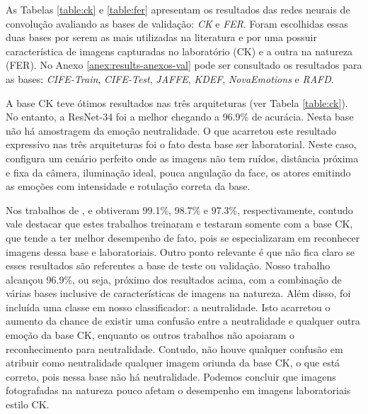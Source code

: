 As Tabelas \ref{table:ck} e \ref{table:fer} apresentam os resultados das redes neurais de convolução avaliando as bases de validação: \textit{CK} e \textit{FER}. Foram escolhidas essas duas bases por serem as mais utilizadas na literatura e por uma possuir característica de imagens capturadas no laboratório (CK) e a outra na natureza (FER). No Anexo \ref{anex:results-anexos-val} pode ser consultado os resultados para as bases: \textit{CIFE-Train}, \textit{CIFE-Test}, \textit{JAFFE}, \textit{KDEF}, \textit{NovaEmotions} e \textit{RAFD}. 

A base CK teve ótimos resultados nas três arquiteturas (ver Tabela \ref{table:ck}). No entanto, a ResNet-34 foi a melhor chegando a 96.9\% de acurácia. Nesta base não há amostragem da emoção neutralidade. O que acarretou este resultado expressivo nas três arquiteturas foi o fato desta base ser laboratorial. Neste caso, configura um cenário perfeito onde as imagens não tem ruídos, distância próxima e fixa da câmera, iluminação ideal, pouca angulação da face, os atores emitindo as emoções com intensidade e rotulação correta da base. 

Nos trabalhos de \cite{art1}, \cite{art11} e \cite{art7} obtiveram  99.1\%, 98.7\% e 97.3\%, respectivamente, contudo vale destacar que estes trabalhos treinaram e testaram somente com a base CK, que tende a ter melhor desempenho de fato, pois se especializaram em reconhecer imagens dessa base e laboratoriais. Outro ponto relevante é que não fica claro se esses resultados são referentes a base de teste ou validação. Nosso trabalho alcançou 96.9\%, ou seja, próximo dos resultados acima, com a combinação de várias bases inclusive de características de imagens na natureza. Além disso, foi incluída uma classe em nosso classificador: a neutralidade. Isto acarretou o aumento da chance de existir uma confusão entre a neutralidade e qualquer outra emoção da base CK, enquanto os outros trabalhos não apoiaram o reconhecimento para neutralidade. Contudo, não houve qualquer confusão em atribuir como neutralidade qualquer imagem oriunda da base CK, o que está correto, pois nessa base não há neutralidade. Podemos concluir que imagens fotografadas na natureza pouco afetam o desempenho em imagens laboratoriais estilo CK. 

